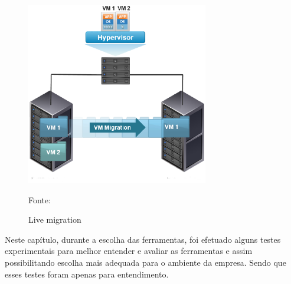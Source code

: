 
\begin{figure}[h!]
 \centering
 \includegraphics[width=300px]{img/vms_migration.eps}
 \caption{Live migration}
 Fonte: \citet{spaniol2015}
 \label{fig:vms_migration}
\end{figure}

Neste capítulo, durante a escolha das ferramentas, foi efetuado alguns testes experimentais para melhor entender e avaliar as ferramentas 
e assim possibilitando escolha mais adequada para o ambiente da empresa. Sendo que esses testes foram apenas para entendimento.


